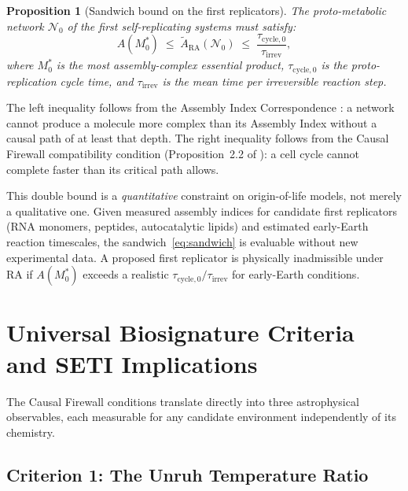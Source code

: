 \documentclass[11pt,a4paper]{article}
\theoremstyle{plain}
\newtheorem{proposition}[theorem]{Proposition}
\theoremstyle{definition}
\theoremstyle{remark}
\newcommand{\tARA}{\tilde{A}_{\mathrm{RA}}}
\begin{document}
\begin{proposition}[Sandwich bound on the first replicators]
\label{prop:sandwich}
The proto-metabolic network $\mathcal{N}_0$ of the first self-replicating
systems must satisfy:
\begin{equation}
  A(M^*_0) \;\leq\; \tARA(\mathcal{N}_0)
  \;\leq\; \frac{\tau_{\mathrm{cycle},0}}{\tau_{\mathrm{irrev}}},
  \label{eq:sandwich}
\end{equation}
where $M^*_0$ is the most assembly-complex essential product, $\tau_{\mathrm{cycle},0}$
is the proto-replication cycle time, and $\tau_{\mathrm{irrev}}$ is the mean
time per irreversible reaction step.
\end{proposition}

The left inequality follows from the Assembly Index Correspondence
\citep{Sandeman2026RAHC}: a network cannot produce a molecule more complex
than its Assembly Index without a causal path of at least that depth.
The right inequality follows from the Causal Firewall compatibility condition
(Proposition~2.2 of \citet{Sandeman2026RACI}):
a cell cycle cannot complete faster than its critical path allows.

This double bound is a \emph{quantitative} constraint on origin-of-life models,
not merely a qualitative one. Given measured assembly indices for candidate
first replicators (RNA monomers, peptides, autocatalytic lipids) and estimated
early-Earth reaction timescales, the sandwich~\eqref{eq:sandwich} is
evaluable without new experimental data. A proposed first replicator is
physically inadmissible under RA if $A(M^*_0)$ exceeds a realistic
$\tau_{\mathrm{cycle},0}/\tau_{\mathrm{irrev}}$ for early-Earth conditions.

\section{Universal Biosignature Criteria and SETI Implications}
\label{sec:predictions}

The Causal Firewall conditions translate directly into three astrophysical
observables, each measurable for any candidate environment independently
of its chemistry.

\subsection{Criterion 1: The Unruh Temperature Ratio}
\end{document}
